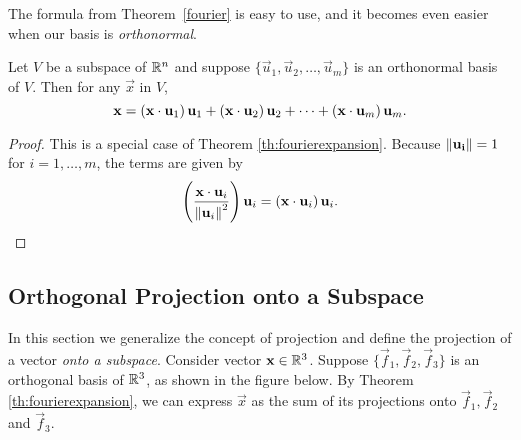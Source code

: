 \documentclass{ximera}
\begin{document}
The formula from Theorem~\ref{fourier} is easy to use, and it becomes even easier when our basis is \emph{orthonormal}.

\begin{corollary}
Let $V$ be a subspace of $\mathbb{R}^n$ and suppose $\{ \vec{u}_1, \vec{u}_2, \ldots, \vec{u}_m \}$
is an orthonormal basis of $V$.
Then for any $\vec{x}$ in $V$,
\[ \mathbf{x} =
\left(\mathbf{x}\cdot \mathbf{u}_1\right) \mathbf{u}_1 +
\left(\mathbf{x}\cdot \mathbf{u}_2\right) \mathbf{u}_2 +
\cdots +
\left(\mathbf{x}\cdot \mathbf{u}_m\right)  \mathbf{u}_m.
\]
\end{corollary}
\begin{proof}
This is a special case of Theorem \ref{th:fourierexpansion}.  Because $\left\lVert\mathbf{u_i}\right\rVert = 1$ for $i=1,\ldots,m$, %
the terms are given by 
$$\left(\frac{\mathbf{x}\cdot \mathbf{u}_i}{\left\lVert\mathbf{u}_i\right\rVert^2}\right)\mathbf{u}_i=\left(\mathbf{x}\cdot \mathbf{u}_i\right) \mathbf{u}_i.$$

\end{proof}

\subsection*{Orthogonal Projection onto a Subspace}

In this section we generalize the concept of projection and define the projection of a vector \emph{onto a subspace}.  Consider vector $\mathbf{x}\in \mathbb{R}^3$.  Suppose $\{\vec{f}_1, \vec{f}_2, \vec{f}_3\}$ is an orthogonal basis of $\mathbb{R}^3$, as shown in the figure below.  By Theorem \ref{th:fourierexpansion}, we can express $\vec{x}$ as the sum of its projections onto $\vec{f}_1, \vec{f}_2$ and  $\vec{f}_3$.
\end{document}
